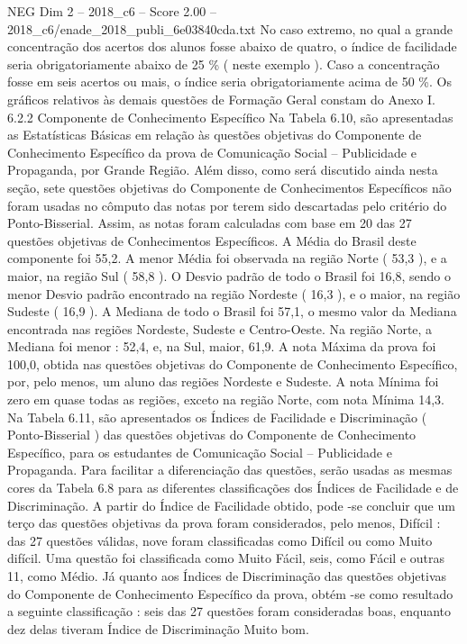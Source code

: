 \begin{textsample}{NEG Dim 2 – 2018\_c6 – Score 2.00 – 2018\_c6/enade\_2018\_publi\_6e03840cda.txt}
No caso extremo, no qual a grande concentração dos acertos dos alunos fosse abaixo de quatro, o índice de facilidade seria obrigatoriamente abaixo de 25 \% ( neste exemplo ).
Caso a concentração fosse em seis acertos ou mais, o índice seria obrigatoriamente acima de 50 \%.
Os gráficos relativos às demais questões de Formação Geral constam do Anexo I. 6.2.2 Componente de Conhecimento Específico Na Tabela 6.10, são apresentadas as Estatísticas Básicas em relação às questões objetivas do Componente de Conhecimento Específico da prova de Comunicação Social – Publicidade e Propaganda, por Grande Região.
Além disso, como será discutido ainda nesta seção, sete questões objetivas do Componente de Conhecimentos Específicos não foram usadas no cômputo das notas por terem sido descartadas pelo critério do Ponto-Bisserial.
Assim, as notas foram calculadas com base em 20 das 27 questões objetivas de Conhecimentos Específicos.
A Média do Brasil deste componente foi 55,2.
A menor Média foi observada na região Norte ( 53,3 ), e a maior, na região Sul ( 58,8 ).
O Desvio padrão de todo o Brasil foi 16,8, sendo o menor Desvio padrão encontrado na região Nordeste ( 16,3 ), e o maior, na região Sudeste ( 16,9 ).
A Mediana de todo o Brasil foi 57,1, o mesmo valor da Mediana encontrada nas regiões Nordeste, Sudeste e Centro-Oeste.
Na região Norte, a Mediana foi menor : 52,4, e, na Sul, maior, 61,9.
A nota Máxima da prova foi 100,0, obtida nas questões objetivas do Componente de Conhecimento Específico, por, pelo menos, um aluno das regiões Nordeste e Sudeste.
A nota Mínima foi zero em quase todas as regiões, exceto na região Norte, com nota Mínima 14,3.
Na Tabela 6.11, são apresentados os Índices de Facilidade e Discriminação ( Ponto-Bisserial ) das questões objetivas do Componente de Conhecimento Específico, para os estudantes de Comunicação Social – Publicidade e Propaganda.
Para facilitar a diferenciação das questões, serão usadas as mesmas cores da Tabela 6.8 para as diferentes classificações dos Índices de Facilidade e de Discriminação.
A partir do Índice de Facilidade obtido, pode -se concluir que um terço das questões objetivas da prova foram considerados, pelo menos, Difícil : das 27 questões válidas, nove foram classificadas como Difícil ou como Muito difícil.
Uma questão foi classificada como Muito Fácil, seis, como Fácil e outras 11, como Médio.
Já quanto aos Índices de Discriminação das questões objetivas do Componente de Conhecimento Específico da prova, obtém -se como resultado a seguinte classificação : seis das 27 questões foram consideradas boas, enquanto dez delas tiveram Índice de Discriminação Muito bom.

\end{textsample}
